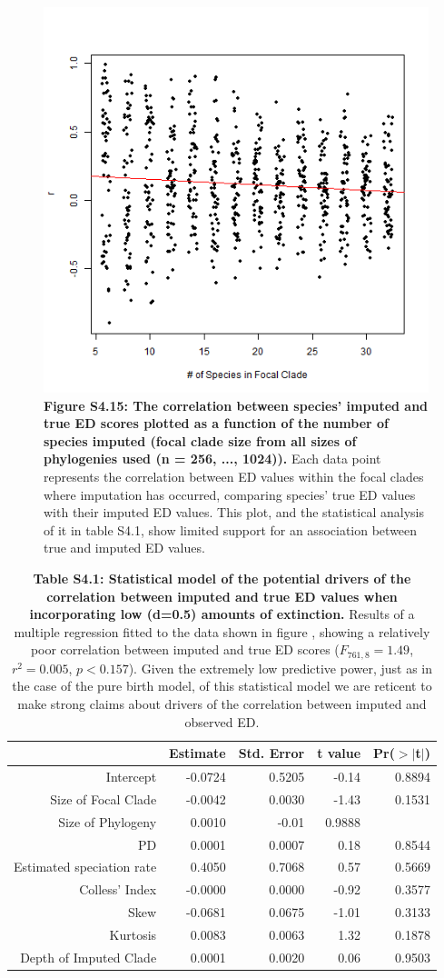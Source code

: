 \documentclass[10pt,english]{article}
\begin{document}
\begin{figure}[!ht]
  \center
  \includegraphics[width=.5\textwidth]{../figures/edModelLowExtinction.png}
  \caption*{\textbf{Figure S4.15: The correlation between species' imputed and
      true ED scores plotted as a function of the number of species imputed
      (focal clade size from all sizes of phylogenies used (n = 256, ...,
      1024)).} Each data point represents the correlation between ED values
      within the focal clades where imputation has occurred, comparing species'
      true ED values with their imputed ED values. This plot, and the
      statistical analysis of it in table S4.1, show limited support for an
      association between true and imputed ED values.}
\end{figure}

\begin{table}[ht]
  \centering
  \begin{tabular}{rrrrr}
    \hline
   & Estimate & Std. Error & t value & Pr($>$$|$t$|$) \\
    \hline
    Intercept & -0.0724 & 0.5205 & -0.14 & 0.8894 \\
    Size of Focal Clade & -0.0042 & 0.0030 & -1.43 & 0.1531 \\
    Size of Phylogeny & 0.0010 & -0.01 & 0.9888 \\
    PD & 0.0001 & 0.0007 & 0.18 & 0.8544 \\
    Estimated speciation rate & 0.4050 & 0.7068 & 0.57 & 0.5669 \\
    Colless' Index & -0.0000 & 0.0000 & -0.92 & 0.3577 \\
    Skew & -0.0681 & 0.0675 & -1.01 & 0.3133 \\
    Kurtosis & 0.0083 & 0.0063 & 1.32 & 0.1878 \\
    Depth of Imputed Clade & 0.0001 & 0.0020 & 0.06 & 0.9503 \\
     \hline
\end{tabular}
\caption*{\textbf{Table S4.1: Statistical model of the potential drivers of the
    correlation between imputed and true ED values when incorporating low
    (d=0.5) amounts of extinction.} Results of a multiple regression fitted to
    the data shown in figure , showing a relatively poor correlation between
    imputed and true ED scores ($F_{761,8} = 1.49$, $r^{2} = 0.005$, $p <
    0.157$). Given the extremely low predictive power, just as in the case of
    the pure birth model, of this statistical model we are reticent to make
    strong claims about drivers of the correlation between imputed and observed
    ED.}
\end{table}
\end{document}
